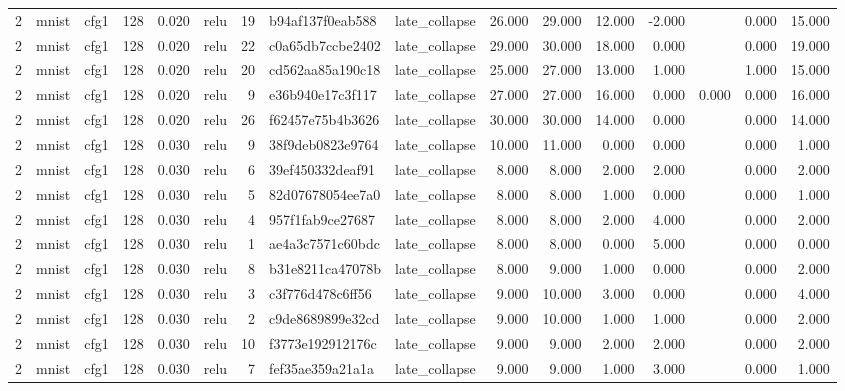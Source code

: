 \begin{table}[htbp]
{\begin{tabular}{@{}rllrrlrllrrrrrrr@{}}
2 & mnist & cfg1 & 128 & 0.020 & relu & 19 & b94af137f0eab588 & late\_collapse & 26.000 & 29.000 & 12.000 & -2.000 &  & 0.000 & 15.000 \\
2 & mnist & cfg1 & 128 & 0.020 & relu & 22 & c0a65db7ccbe2402 & late\_collapse & 29.000 & 30.000 & 18.000 & 0.000 &  & 0.000 & 19.000 \\
2 & mnist & cfg1 & 128 & 0.020 & relu & 20 & cd562aa85a190c18 & late\_collapse & 25.000 & 27.000 & 13.000 & 1.000 &  & 1.000 & 15.000 \\
2 & mnist & cfg1 & 128 & 0.020 & relu & 9 & e36b940e17c3f117 & late\_collapse & 27.000 & 27.000 & 16.000 & 0.000 & 0.000 & 0.000 & 16.000 \\
2 & mnist & cfg1 & 128 & 0.020 & relu & 26 & f62457e75b4b3626 & late\_collapse & 30.000 & 30.000 & 14.000 & 0.000 &  & 0.000 & 14.000 \\
2 & mnist & cfg1 & 128 & 0.030 & relu & 9 & 38f9deb0823e9764 & late\_collapse & 10.000 & 11.000 & 0.000 & 0.000 &  & 0.000 & 1.000 \\
2 & mnist & cfg1 & 128 & 0.030 & relu & 6 & 39ef450332deaf91 & late\_collapse & 8.000 & 8.000 & 2.000 & 2.000 &  & 0.000 & 2.000 \\
2 & mnist & cfg1 & 128 & 0.030 & relu & 5 & 82d07678054ee7a0 & late\_collapse & 8.000 & 8.000 & 1.000 & 0.000 &  & 0.000 & 1.000 \\
2 & mnist & cfg1 & 128 & 0.030 & relu & 4 & 957f1fab9ce27687 & late\_collapse & 8.000 & 8.000 & 2.000 & 4.000 &  & 0.000 & 2.000 \\
2 & mnist & cfg1 & 128 & 0.030 & relu & 1 & ae4a3c7571c60bdc & late\_collapse & 8.000 & 8.000 & 0.000 & 5.000 &  & 0.000 & 0.000 \\
2 & mnist & cfg1 & 128 & 0.030 & relu & 8 & b31e8211ca47078b & late\_collapse & 8.000 & 9.000 & 1.000 & 0.000 &  & 0.000 & 2.000 \\
2 & mnist & cfg1 & 128 & 0.030 & relu & 3 & c3f776d478c6ff56 & late\_collapse & 9.000 & 10.000 & 3.000 & 0.000 &  & 0.000 & 4.000 \\
2 & mnist & cfg1 & 128 & 0.030 & relu & 2 & c9de8689899e32cd & late\_collapse & 9.000 & 10.000 & 1.000 & 1.000 &  & 0.000 & 2.000 \\
2 & mnist & cfg1 & 128 & 0.030 & relu & 10 & f3773e192912176c & late\_collapse & 9.000 & 9.000 & 2.000 & 2.000 &  & 0.000 & 2.000 \\
2 & mnist & cfg1 & 128 & 0.030 & relu & 7 & fef35ae359a21a1a & late\_collapse & 9.000 & 9.000 & 1.000 & 3.000 &  & 0.000 & 1.000 \\

\end{tabular}}
\end{table}
